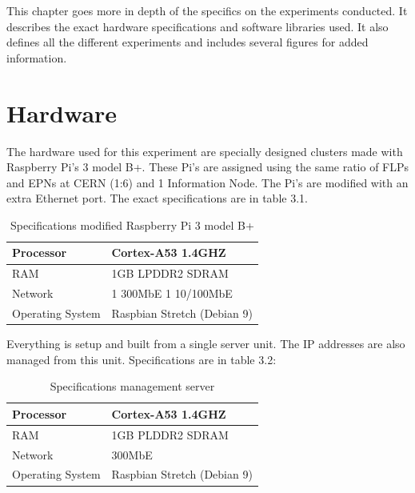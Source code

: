This chapter goes more in depth of the specifics on the experiments conducted. It describes the exact hardware specifications and software libraries used. It also defines all the different experiments and includes several figures for added information.
\section{Hardware}
The hardware used for this experiment are specially designed clusters made with Raspberry Pi's 3 model B+. These Pi's are assigned using the same ratio of FLPs and EPNs at CERN (1:6) and 1 Information Node. The Pi's are modified with an extra Ethernet port. The exact specifications are in table 3.1.

\begin{table}[htb]
\begin{tabular}{| l | l |}
\hline
Processor & Cortex-A53 1.4GHZ\\ \hline
RAM & 1GB LPDDR2 SDRAM\\ \hline
Network & 1 300MbE 1 10/100MbE \\ \hline
Operating System & Raspbian Stretch (Debian 9)\\ \hline
\end{tabular} 
\caption{Specifications modified Raspberry Pi 3 model B+}
\end{table}

Everything is setup and built from a single server unit. The IP addresses are also managed from this unit. Specifications are in table 3.2:

\begin{table}[htb]
\begin{tabular}{| l | l |}
\hline
Processor & Cortex-A53 1.4GHZ\\ \hline
RAM & 1GB PLDDR2 SDRAM\\ \hline
Network & 300MbE\\ \hline
Operating System & Raspbian Stretch (Debian 9)\\ \hline
\end{tabular}
\caption{Specifications management server}
\end{table}

\newpage

